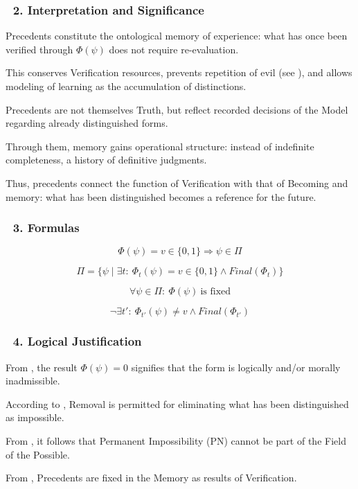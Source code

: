 \documentclass[12pt]{article}
\begin{document}
\subsubsection*{🔹 2. Interpretation and Significance}

Precedents constitute the ontological memory of experience: what has once been verified through $\Phi(\psi)$ does not require re-evaluation.

This conserves Verification resources, prevents repetition of evil (see \text{[11.11]}), and allows modeling of learning as the accumulation of distinctions.

Precedents are not themselves Truth, but reflect recorded decisions of the Model regarding already distinguished forms.

Through them, memory gains operational structure: instead of indefinite completeness, a history of definitive judgments.

Thus, precedents connect the function of Verification with that of Becoming and memory: what has been distinguished becomes a reference for the future.

\subsubsection*{🔹 3. Formulas}

\[
\Phi(\psi) = v \in \{0,1\} \Rightarrow \psi \in \Pi
\]

\[
\Pi = \{\psi \mid \exists t:\ \Phi_t(\psi) = v \in \{0,1\} \land Final(\Phi_t)\}
\]

\[
\forall \psi \in \Pi:\ \Phi(\psi)\ \text{is fixed}
\]

\[
\neg \exists t':\ \Phi_{t'}(\psi) \neq v \land Final(\Phi_{t'})
\]

\subsubsection*{🔹 4. Logical Justification}

From \text{[11.1.1]}, the result $\Phi(\psi) = 0$ signifies that the form is logically and/or morally inadmissible.

According to \text{[10.3.3]}, Removal is permitted for eliminating what has been distinguished as impossible.

From \text{[4.1]}, it follows that Permanent Impossibility (PN) cannot be part of the Field of the Possible.

From \text{[11.10]}, Precedents are fixed in the Memory as results of Verification.
\end{document}

